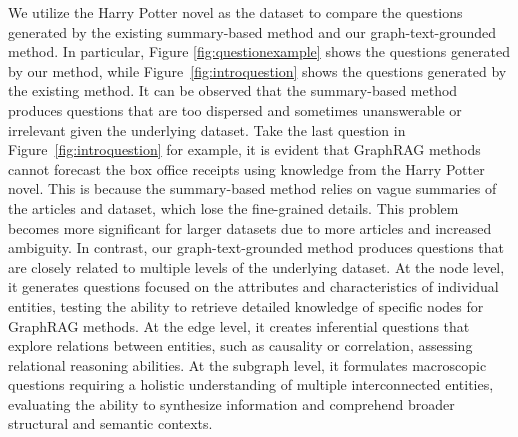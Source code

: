 We utilize the Harry Potter novel as the dataset to compare the questions generated by the existing summary-based method and our graph-text-grounded method. In particular, Figure \ref{fig:questionexample} shows the questions generated by our method, while Figure~\ref{fig:introquestion} shows the questions generated by the existing method. 
It can be observed that the summary-based method produces questions that are too dispersed and sometimes unanswerable or irrelevant given the underlying dataset. Take the last question in Figure~\ref{fig:introquestion} for example, it is evident that GraphRAG methods cannot forecast the box office receipts using knowledge from the Harry Potter novel. This is because the summary-based method relies on vague summaries of the articles and dataset, which lose the fine-grained details. This problem becomes more significant for larger datasets due to more articles and increased ambiguity.
In contrast, our graph-text-grounded method produces questions that are closely related to multiple levels of the underlying dataset. At the node level, it generates questions focused on the attributes and characteristics of individual entities, testing the ability to retrieve detailed knowledge of specific nodes for GraphRAG methods. At the edge level, it creates inferential questions that explore relations between entities, such as causality or correlation, assessing relational reasoning abilities. At the subgraph level, it formulates macroscopic questions requiring a holistic understanding of multiple interconnected entities, evaluating the ability to synthesize information and comprehend broader structural and semantic contexts. 

